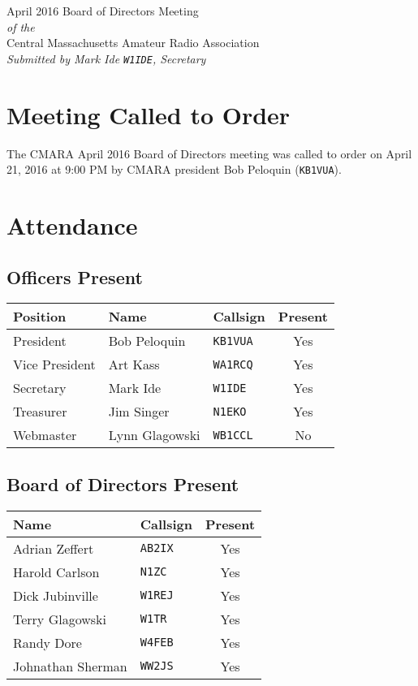 \documentclass[10pt,letterpaper]{article}
\begin{document}
\begin{center}
{\huge April 2016 Board of Directors Meeting}\\
\emph{of the}\\
{\Large Central Massachusetts Amateur Radio Association}\\
\emph{Submitted by Mark Ide \texttt{W1IDE}, Secretary}
\end{center}

\section{Meeting Called to Order}
The CMARA April 2016 Board of Directors meeting was called to order on April 21, 2016 at 9:00 PM by CMARA president Bob Peloquin (\texttt{KB1VUA}).

\section{Attendance}

\subsection{Officers Present}

\begin{tabular}{|l|l|l|c|}
  \hline
  \textbf{Position} & \textbf{Name}  & \textbf{Callsign} & \textbf{Present} \\ \hline
  President         & Bob Peloquin   & \texttt{KB1VUA}   & Yes  \\
  Vice President    & Art Kass       & \texttt{WA1RCQ}   & Yes  \\
  Secretary         & Mark Ide       & \texttt{W1IDE}    & Yes  \\
  Treasurer         & Jim Singer     & \texttt{N1EKO}    & Yes  \\
  Webmaster         & Lynn Glagowski & \texttt{WB1CCL}   & No   \\
  \hline
\end{tabular}

\subsection{Board of Directors Present}

\begin{tabular}{|l|l|c|}
  \hline
  \textbf{Name}     & \textbf{Callsign} & \textbf{Present} \\ \hline
  Adrian Zeffert    & \texttt{AB2IX}    & Yes \\
  Harold Carlson    & \texttt{N1ZC}     & Yes \\
  Dick Jubinville   & \texttt{W1REJ}    & Yes \\
  Terry Glagowski   & \texttt{W1TR}     & Yes \\
  Randy Dore        & \texttt{W4FEB}    & Yes \\
  Johnathan Sherman & \texttt{WW2JS}    & Yes \\
  \hline
\end{tabular}
\end{document}
